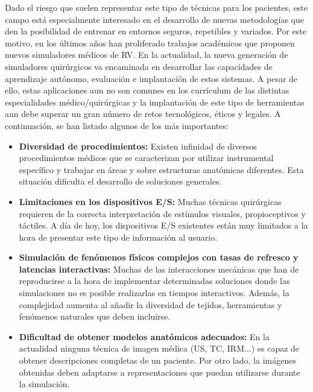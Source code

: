 Dado el riesgo que suelen representar este tipo de técnicas para los pacientes, este campo está especialmente interesado en el desarrollo de nuevas metodologías que den la  posibilidad de entrenar en entornos seguros, repetibles y variados. Por este motivo, en los últimos años han proliferado trabajos académicos que proponen nuevos simuladores médicos de \ac{RV}\cite{korzeniowski2018vcsim3,cecil2017advanced}. En la actualidad, la nueva generación de simuladores quirúrgicos va encaminada en desarrollar las capacidades de aprendizaje autónomo, evaluación e implantación de estos sistemas. A pesar de ello, estas aplicaciones aun no son comunes en los currículum de las distintas especialidades médico/quirúrgicas y la implantación de este tipo de herramientas aun debe superar un gran número de retos tecnológicos, éticos y legales. A continuación, se han listado algunos de los más importantes:
\begin{itemize}
    \item \textbf{Diversidad de procedimientos:} Existen infinidad de diversos procedimientos médicos que se caracterizan por utilizar instrumental específico y trabajar en áreas y sobre estructuras anatómicas diferentes. Esta situación dificulta el desarrollo de soluciones generales.
    \item \textbf{Limitaciones en los dispositivos \ac{E/S}:} Muchas técnicas quirúrgicas requieren de la correcta interpretación de estímulos visuales, propioceptivos y táctiles. A día de hoy, los dispositivos E/S existentes están muy limitados a la hora de presentar este tipo de información al usuario. 
    \item \textbf{Simulación de fenómenos físicos complejos con tasas de refresco y latencias interactivas:} Muchas de las interacciones mecánicas que han de reproducirse a la hora de implementar determinadas soluciones donde las simulaciones no es posible realizarlas en tiempos interactivos. Además, la complejidad aumenta al añadir la diversidad de tejidos, herramientas y fenómenos naturales que deben incluirse. 
    \item \textbf{Dificultad de obtener modelos anatómicos adecuados:} En la actualidad ninguna técnica de imagen médica (\ac{US}, \ac{TC}, \ac{IRM}...) es capaz de obtener descripciones completas de un paciente. Por otro lado, la imágenes obtenidas deben adaptarse a representaciones que puedan utilizarse durante la simulación.
\end{itemize}
